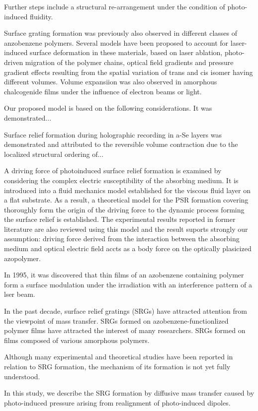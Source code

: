 Further steps include a structural re-arrangement under the condition
of photo-induced fluidity.

Surface grating formation was previously also observed in different
classes of anzobenzene polymers. Several models have been proposed to
account for laser-induced surface deformation in these materials,
based on laser ablation, photo-driven migration of the polymer chains,
optical field gradients and pressure gradient effects resulting from
the spatial variation of trans and cis isomer having different
volumes. Volume expansiion was also observed in amorphous chalcogenide
films under the influence of electron beams or light.

Our proposed model is based on the following considerations. It was
demonstrated...

Surface relief formation during holographic recording in a-Se layers
was demonstrated and attributed to the reversible volume contraction
due to the localized structural ordering of...

A driving force of photoinduced surface relief formation is examined
by considering the complex electric susceptibility of the absorbing
medium. It is introduced into a fluid mechanics model established for
the viscous fluid layer on a flat substrate. As a result, a
theoretical model for the PSR formation covering thoroughly form the
origin of the driving force to the dynamic process forming the surface
relief is established. The experimental results reported in former
literature are also reviewed using this model and the result suports
strongly our assumption: driving force derived from the interaction
between the absorbing medium and optical electric field accts as a
body force on the optically plasicized azopolymer.

In 1995, it was discovered that thin films of an azobenzene containing
polymer form a surface modulation under the irradiation with an
interference pattern of a lser beam.

In the past decade, surface relief gratings (SRGs) have attracted attention
from the viewpoint of mass transfer. SRGs formed on
azobenzene-functionlized polymer films have attracted the interest of
many researchers. SRGs formed on films composed of various amorphous
polymers.

Although many experimental and theoretical studies have been reported
in relation to SRG formation, the mechanism of its formation is not
yet fully understood.

In this study, we describe the SRG formation by diffusive mass
transfer caused by photo-induced pressure arising from realignment of
photo-induced dipoles.

